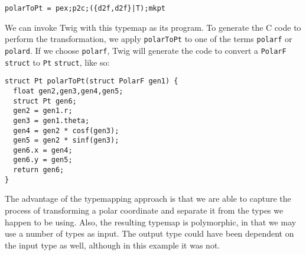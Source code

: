 \begin{verbatim}
polarToPt = pex;p2c;({d2f,d2f}|T);mkpt
\end{verbatim}

We can invoke Twig with this typemap as its program. To generate the C code to perform the transformation, we apply \texttt{polarToPt} to one of the terms \texttt{polarf} or \texttt{polard}. If we choose \texttt{polarf}, Twig will generate the code to convert a \texttt{PolarF} \texttt{struct} to \texttt{Pt} \texttt{struct}, like so:

\begin{verbatim}
struct Pt polarToPt(struct PolarF gen1) {
  float gen2,gen3,gen4,gen5;
  struct Pt gen6;
  gen2 = gen1.r;
  gen3 = gen1.theta;
  gen4 = gen2 * cosf(gen3);
  gen5 = gen2 * sinf(gen3);
  gen6.x = gen4;
  gen6.y = gen5;
  return gen6;
}
\end{verbatim}

The advantage of the typemapping approach is that we are able to capture the process of transforming a polar coordinate and separate it from the types we happen to be using. Also, the resulting typemap is polymorphic, in that we may use a number of types as input. The output type could have been dependent on the input type as well, although in this example it was not.
